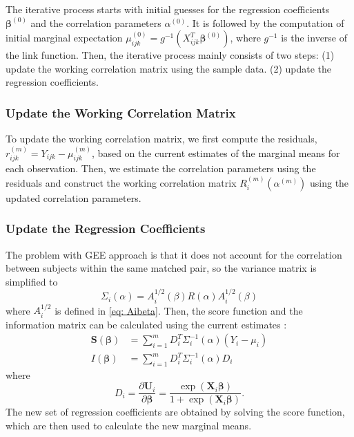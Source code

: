 \documentclass[
]{aft}
\begin{document}
The iterative process starts with initial guesses for the regression
coefficients \(\boldsymbol{\beta}^{(0)}\) and the correlation parameters
\(\alpha^{(0)}\). It is followed by the computation of initial marginal
expectation
\(\mu_{ijk}^{(0)} = g^{-1}(X_{ijk}^T \boldsymbol{\beta}^{(0)})\), where
\(g^{-1}\) is the inverse of the link function. Then, the iterative
process mainly consists of two steps: (1) update the working correlation
matrix using the sample data. (2) update the regression coefficients.

\subsubsection{Update the Working Correlation
Matrix}\label{update-the-working-correlation-matrix}

To update the working correlation matrix, we first compute the
residuals, \(r_{ijk}^{(m)} = Y_{ijk} - \mu_{ijk}^{(m)}\), based on the
current estimates of the marginal means for each observation. Then, we
estimate the correlation parameters using the residuals and construct
the working correlation matrix \(R_i^{(m)}(\alpha^{(m)})\) using the
updated correlation parameters.

\subsubsection{Update the Regression
Coefficients}\label{update-the-regression-coefficients}

The problem with GEE approach is that it does not account for the
correlation between subjects within the same matched pair, so the
variance matrix is simplified to \begin{equation}
\Sigma_i(\alpha) = A_i^{1/2}(\beta)R(\alpha)A_i^{1/2}(\beta) \label{eq:geeCovMat}
\end{equation} where \(A_i^{1/2}\) is defined in \eqref{eq: Aibeta}.
Then, the score function and the information matrix can be calculated
using the current estimates \citep{Zeger1988}: \begin{align}
\boldsymbol{S}(\boldsymbol{\beta}) &= \sum_{i=1}^m D_i^T \Sigma_i^{-1}(\alpha) (Y_i - \mu_i) \label{eq:geeScoreEqs}\\
I(\boldsymbol{\beta}) &= \sum_{i=1}^m D_i^T\Sigma_i^{-1}(\alpha)D_i \label{eq:geeInfoMat}
\end{align} where \begin{equation}
D_i = \frac{\partial \boldsymbol{U}_i}{\partial \boldsymbol{\beta}} = \frac{\exp(\boldsymbol{X}_i\boldsymbol{\beta})}{1+\exp(\boldsymbol{X}_i \boldsymbol{\beta})}. \label{eq:Di}
\end{equation} The new set of regression coefficients are obtained by
solving the score function, which are then used to calculate the new
marginal means.
\end{document}
